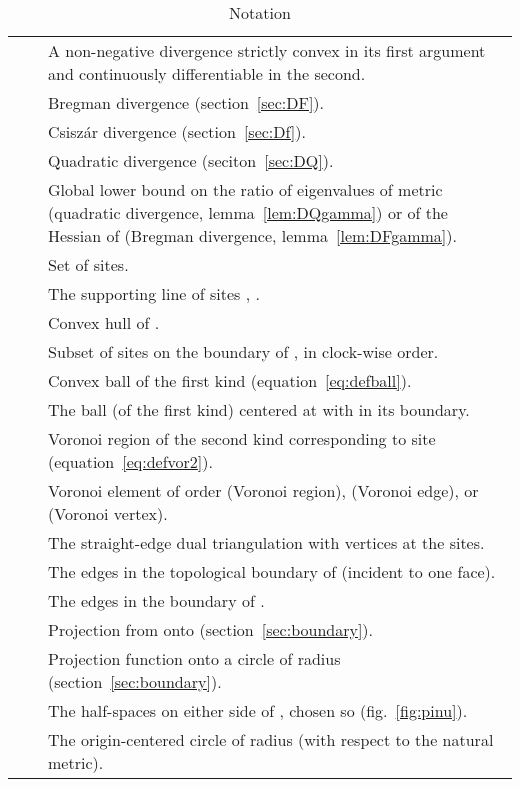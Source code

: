 \documentclass[11pt]{article}
\begin{document}
\begin{table}[htbp]\caption{Notation}\label{table:notation}
\begin{center}
\begin{tabular}{r c p{11cm} }
\toprule
 && A non-negative divergence strictly convex in its first argument and continuously differentiable in the second. \\
 && Bregman divergence (section~\ref{sec:DF}). \\
 && Csisz\'ar divergence (section~\ref{sec:Df}).\\
 && Quadratic divergence (seciton~\ref{sec:DQ}).\\
 && Global lower bound on the ratio of eigenvalues 
	of metric  (quadratic divergence, lemma~\ref{lem:DQgamma}) 
	or of the Hessian of  (Bregman divergence, lemma~\ref{lem:DFgamma}). \\
 && Set of  sites. \\
 && The supporting line of sites , . \\
 && Convex hull of . \\
 && Subset of sites on the boundary of , in clock-wise order. \\  && Convex ball of the first kind (equation~\eqref{eq:defball}). \\
 && The ball (of the first kind)   centered at  with  in its boundary. \\
 && Voronoi region of the second kind corresponding to site  (equation~\eqref{eq:defvor2}). \\
 && Voronoi element of order  (Voronoi region),  (Voronoi edge), or  (Voronoi vertex).\\
 && The straight-edge dual triangulation with vertices at the sites. \\
 && The edges in the topological boundary of  (incident to one face). \\
 && The edges in the boundary of . \\
 && Projection from  onto  (section~\ref{sec:boundary}). \\
 && Projection function onto a circle of radius  (section~\ref{sec:boundary}). \\
 && The half-spaces on either side of , chosen so  (fig.~\ref{fig:pinu}). \\
 && The origin-centered circle of radius  (with respect to the natural metric). \\
\bottomrule
\end{tabular}
\end{center}
\end{table}
\end{document}
